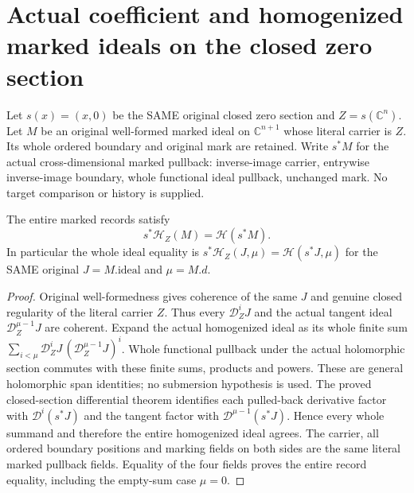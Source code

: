 \chapter{Actual coefficient and homogenized marked ideals on the closed zero section}

Let $s(x)=(x,0)$ be the SAME original closed zero section and $Z=s(\mathbb C^n)$. Let $M$ be an original well-formed marked ideal on $\mathbb C^{n+1}$ whose literal carrier is $Z$. Its whole ordered boundary and original mark are retained. Write $s^*M$ for the actual cross-dimensional marked pullback: inverse-image carrier, entrywise inverse-image boundary, whole functional ideal pullback, unchanged mark. No target comparison or history is supplied.

\begin{theorem}
\label{hir:actual-zero-section-whole-homogenized-marked}
\leanok
The entire marked records satisfy
\[
 s^*\mathcal H_Z(M)=\mathcal H(s^*M).
\]
In particular the whole ideal equality is
$s^*\mathcal H_Z(J,\mu)=\mathcal H(s^*J,\mu)$ for the SAME original $J=M.\mathrm{ideal}$ and $\mu=M.d$.
\end{theorem}
\begin{proof}
Original well-formedness gives coherence of the same $J$ and genuine closed regularity of the literal carrier $Z$. Thus every $\mathcal D_Z^iJ$ and the actual tangent ideal $\mathcal D_Z^{\mu-1}J$ are coherent. Expand the actual homogenized ideal as its whole finite sum
$\sum_{i<\mu}\mathcal D_Z^iJ\,(\mathcal D_Z^{\mu-1}J)^i$.
Whole functional pullback under the actual holomorphic section commutes with these finite sums, products and powers. These are general holomorphic span identities; no submersion hypothesis is used. The proved closed-section differential theorem identifies each pulled-back derivative factor with $\mathcal D^i(s^*J)$ and the tangent factor with $\mathcal D^{\mu-1}(s^*J)$. Hence every whole summand and therefore the entire homogenized ideal agrees. The carrier, all ordered boundary positions and marking fields on both sides are the same literal marked pullback fields. Equality of the four fields proves the entire record equality, including the empty-sum case $\mu=0$.
\end{proof}

